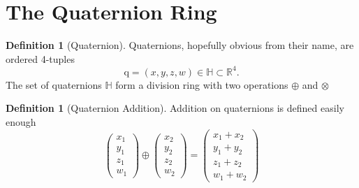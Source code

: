 \documentclass{amsart}
\theoremstyle{definition}
\newtheorem{definition}[theorem]{Definition}
\theoremstyle{remark}
\numberwithin{equation}{section}
\begin{document}
\section{The Quaternion Ring}
\begin{definition}[Quaternion]
  Quaternions, hopefully obvious from their name, are ordered 4-tuples
  \begin{equation}
    \mathrm{q}=(x, y, z, w)\in\mathbb{H}\subset\mathbb{R}^4.
  \end{equation}
  The set of quaternions $\mathbb{H}$ form a division ring with two operations $\oplus$ and $\otimes$
\end{definition}
\begin{definition}[Quaternion Addition]
  Addition on quaternions is defined easily enough
  \begin{equation}
    \begin{pmatrix}
      x_1 \\
      y_1 \\
      z_1 \\
      w_1
    \end{pmatrix} \oplus
    \begin{pmatrix}
      x_2 \\
      y_2 \\
      z_2 \\
      w_2
    \end{pmatrix} =
    \begin{pmatrix}
      x_1 + x_2 \\
      y_1 + y_2 \\
      z_1 + z_2 \\
      w_1 + w_2
    \end{pmatrix}
  \end{equation}
\end{definition}
\end{document}
